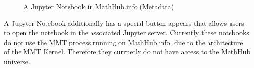 \begin{figure}[ht]\centering
  \caption{A Jupyter Notebook in MathHub.info (Metadata)}\label{fig:mathhub-NB}
\end{figure}

A Jupyter Notebook additionally has a special button appears that allows users to open the notebook in the associated Jupyter server. Currently these notebooks do not use the MMT process running on MathHub.info, due to the architecture of the MMT Kernel. Therefore they currnetly do not have access to the MathHub universe. 




